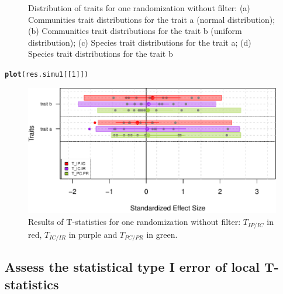 \documentclass[12pt]{article}\usepackage[]{graphicx}\usepackage[]{color}
\makeatletter
\def\maxwidth{ %
  \ifdim\Gin@nat@width>\linewidth
    \linewidth
  \else
    \Gin@nat@width
  \fi
}
\newcommand{\hlnum}[1]{\textcolor[rgb]{0.686,0.059,0.569}{#1}}%
\newcommand{\hlstd}[1]{\textcolor[rgb]{0.345,0.345,0.345}{#1}}%
\newcommand{\hlkwd}[1]{\textcolor[rgb]{0.737,0.353,0.396}{\textbf{#1}}}%
\newenvironment{kframe}{%
 \def\at@end@of@kframe{}%
 \ifinner\ifhmode%
  \def\at@end@of@kframe{\end{minipage}}%
  \begin{minipage}{\columnwidth}%
 \fi\fi%
 \def\FrameCommand##1{\hskip\@totalleftmargin \hskip-\fboxsep
 \colorbox{shadecolor}{##1}\hskip-\fboxsep
     \hskip-\linewidth \hskip-\@totalleftmargin \hskip\columnwidth}%
 \MakeFramed {\advance\hsize-\width
   \@totalleftmargin\z@ \linewidth\hsize
   \@setminipage}}%
 {\par\unskip\endMakeFramed%
 \at@end@of@kframe}
\newenvironment{knitrout}{}{} %
\makeatother
\begin{document}
\begin{knitrout}
\begin{figure}
{}

\caption[Distribution of traits for one randomization without filter]{Distribution of traits for one randomization without filter: (a) Communities trait distributions for the trait a (normal distribution); (b) Communities trait distributions for the trait b (uniform distribution); (c) Species trait distributions for the trait a; (d) Species trait distributions for the trait b}\label{fig:No_Filter_plots}
\end{figure}


\end{knitrout}

\begin{knitrout}\small
{}\color{fgcolor}\begin{kframe}
\begin{alltt}
\hlkwd{plot}\hlstd{(res.simu1[[}\hlnum{1}\hlstd{]])}
\end{alltt}
\end{kframe}\begin{figure}

{\centering \includegraphics[width=\maxwidth]{figure/No_Filter_plots_Tstats-1} 

}

\caption[Results of T-statistics for one randomization without filter]{Results of T-statistics for one randomization without filter: $T_{IP/IC}$ in red, $T_{IC/IR}$ in purple and $T_{PC/PR}$ in green.}\label{fig:No_Filter_plots_Tstats}
\end{figure}


\end{knitrout}

 \subsection {Assess the statistical type I error of local T-statistics}
 
\end{document}
